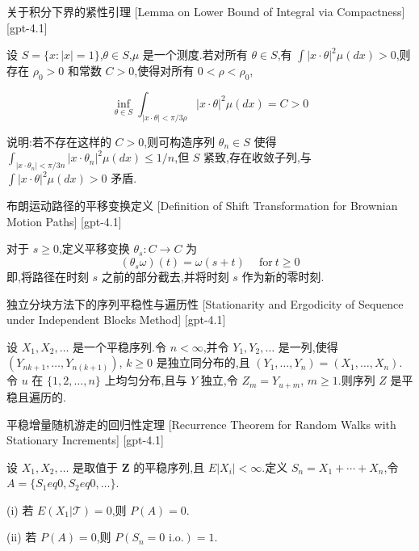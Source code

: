 \documentclass[UTF8]{ctexart}
\begin{document}
    \begin{lma}
        {关于积分下界的紧性引理}
        [Lemma on Lower Bound of Integral via Compactness]
        [gpt-4.1]
        
设 $S = \{x : |x| = 1\}$,$\theta \in S$,$\mu$ 是一个测度.若对所有 $\theta \in S$,有 $\int |x \cdot \theta|^{2} \mu(dx) > 0$,则存在 $\rho_{0} > 0$ 和常数 $C > 0$,使得对所有 $0 < \rho < \rho_{0}$,

\[
\inf_{\theta \in S} \int_{|x \cdot \theta| < \pi/3\rho} |x \cdot \theta|^{2} \mu(dx) = C > 0
\]

说明:若不存在这样的 $C > 0$,则可构造序列 $\theta_n \in S$ 使得 $\int_{|x \cdot \theta_{n}| < \pi/3n} |x \cdot \theta_{n}|^{2} \mu(dx) \leq 1/n$,但 $S$ 紧致,存在收敛子列,与 $\int |x \cdot \theta|^{2} \mu(dx) > 0$ 矛盾.

    \end{lma}
    
    
    
    \begin{dfn}
        {布朗运动路径的平移变换定义}
        [Definition of Shift Transformation for Brownian Motion Paths]
        [gpt-4.1]
        
对于 $s \geq 0$,定义平移变换 $\theta_s : C \to C$ 为
\[
(\theta_s \omega)(t) = \omega(s + t) \quad \mathrm{~for~} t \geq 0
\]
即,将路径在时刻 $s$ 之前的部分截去,并将时刻 $s$ 作为新的零时刻.

    \end{dfn}
    
    
    
    \begin{thm}
        {独立分块方法下的序列平稳性与遍历性}
        [Stationarity and Ergodicity of Sequence under Independent Blocks Method]
        [gpt-4.1]
        
设 $X_1, X_2, \dots$ 是一个平稳序列.令 $n<\infty$,并令 $Y_1, Y_2, \ldots$ 是一列,使得 $(Y_{nk+1}, \ldots, Y_{n(k+1)})$, $k\geq 0$ 是独立同分布的,且 $(Y_1, \dots, Y_n) = (X_1, \dots, X_n)$.令 $
u$ 在 $\{1,2,\ldots,n\}$ 上均匀分布,且与 $Y$ 独立,令 $Z_m = Y_{
u + m}$, $m\geq 1$.则序列 $Z$ 是平稳且遍历的.

    \end{thm}
    
    
    
    \begin{thm}
        {平稳增量随机游走的回归性定理}
        [Recurrence Theorem for Random Walks with Stationary Increments]
        [gpt-4.1]
        
设 $X_1, X_2, \dots$ 是取值于 $\mathbf{Z}$ 的平稳序列,且 $E|X_i| < \infty$.定义 $S_n = X_1 + \cdots + X_n$,令 $A = \{ S_1 
eq 0, S_2 
eq 0, \ldots \}$.

(i) 若 $E(X_1 | \mathcal{T}) = 0$,则 $P(A) = 0$.

(ii) 若 $P(A) = 0$,则 $P( S_n = 0 \text{ i.o.} ) = 1$.

    \end{thm}
    
\end{document}
